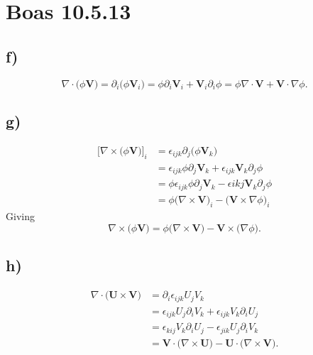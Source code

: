 \documentclass[a4paper, 11pt, titlepage, english]{article}
\newcommand{\eps}{\epsilon}
\newcommand{\bt}[1]{\boldsymbol{#1}}
\newcommand{\p}{\partial}
\begin{document}
\section*{Boas 10.5.13}
\subsection*{f)}
$$\nabla \cdot \big(\phi\bt{V}\big) = \partial_i \big(\phi\bt{V}_i\big) = \phi\partial_i\bt{V}_i + \bt{V}_i \partial_i \phi = \phi\nabla \cdot \bt{V} + \bt{V}\cdot\nabla\phi.$$

\subsection*{g)}
\begin{align*}
\big[\nabla \times \big(\phi \bt{V}\big)\big]_i &=  \eps_{ijk} \partial_j\big(\phi\bt{V}_k\big) \\[0.1cm]
&= \eps_{ijk} \phi \partial_j \bt{V}_k+ \eps_{ijk} \bt{V}_k \partial_j \phi \\[0.1cm]
&= \phi \eps_{ijk}\phi\partial_j\bt{V}_k - \eps{ikj}\bt{V}_k \partial_j \phi \\[0.1cm]
&= \phi\big(\nabla\times\bt{V}\big)_i - \big(\bt{V}\times\nabla\phi\big)_i
\end{align*}
Giving
$$ \nabla \times \big(\phi \bt{V}\big) =  \phi\big(\nabla \times \bt{V}\big) - \bt{V}\times\big(\nabla\phi\big).$$

\subsection*{h)}
\begin{align*}
\nabla\cdot\big(\bt{U}\times\bt{V}\big) &= \p_i \eps_{ijk} U_j V_k \\[0.1cm]
&= \eps_{ijk} U_j\p_iV_k + \eps_{ijk}V_k\p_iU_j \\[0.1cm]
&= \eps_{kij}V_k\p_i U_j - \eps_{jik}U_j\p_iV_k \\[0.1cm]
&= \bt{V} \cdot \big(\nabla \times \bt{U}\big) - \bt{U} \cdot \big(\nabla \times \bt{V}\big).
\end{align*}
\end{document}
